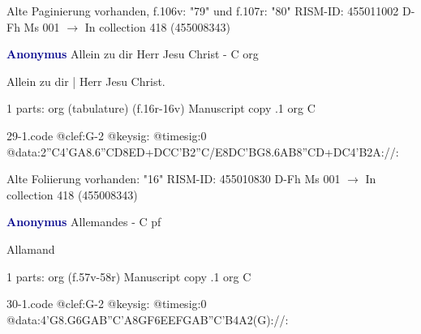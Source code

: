 \documentclass[twocolumn]{book}
\begin{document}
\newline Alte Paginierung vorhanden, f.106v: "79" und f.107r: "80"
\newline RISM-ID: 455011002
\newline D-Fh  Ms 001
\newline $\rightarrow$ In collection 418 (455008343)
      
\newline \par \vspace{7pt} \textcolor{darkblue}{\textbf{Anonymus  }}
\newline Allein zu dir Herr Jesu Christ - C
\newline org
\newline \begin{itshape}[f.16r, at left:] Allein zu dir | Herr Jesu Christ.\end{itshape} 
\newline \textcolor{darkblue}{}  1 parts: org (tabulature)  (f.16r-16v)
\newline Manuscript copy
.1  org  C  
\begin{filecontents*}{29-1.code}
@clef:G-2
@keysig:
@timesig:0
@data:2''C4'GA{8.6''CD8ED+}{DCC'B}2''C/E{8DC'BG}{8.6AB8''CD+}{DC}4'B2A://:
\end{filecontents*}
\newline
%

\newline Alte Foliierung vorhanden: "16"
\newline RISM-ID: 455010830
\newline D-Fh  Ms 001
\newline $\rightarrow$ In collection 418 (455008343)
      
\newline \par \vspace{7pt} \textcolor{darkblue}{\textbf{Anonymus  }}
\newline Allemandes - C
\newline pf
\newline \begin{itshape}[f.57v, at left:] Allamand\end{itshape} 
\newline \textcolor{darkblue}{}  1 parts: org  (f.57v-58r)
\newline Manuscript copy
.1  org  C  
\begin{filecontents*}{30-1.code}
@clef:G-2
@keysig:
@timesig:0
@data:4'G{8.G6G}{AB''C'A}{8GF}{6EEFG}{AB''C'B}4A2(G)://:
\end{filecontents*}
\newline
%
\end{document}
